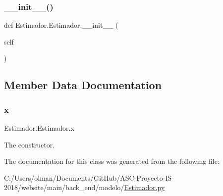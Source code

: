 \subsubsection{\texorpdfstring{\+\_\+\+\_\+init\+\_\+\+\_\+()}{\_\_init\_\_()}}
{\footnotesize\ttfamily def Estimador.\+Estimador.\+\_\+\+\_\+init\+\_\+\+\_\+ (\begin{DoxyParamCaption}\item[{}]{self }\end{DoxyParamCaption})}



\subsection{Member Data Documentation}
\mbox{\label{class_estimador_1_1_estimador_a998588ba815fd0c90fb8abbcf9456693}} 
\subsubsection{\texorpdfstring{x}{x}}
{\footnotesize\ttfamily Estimador.\+Estimador.\+x}



The constructor. 



The documentation for this class was generated from the following file\+:\begin{DoxyCompactItemize}
\item 
C\+:/\+Users/olman/\+Documents/\+Git\+Hub/\+A\+S\+C-\/\+Proyecto-\/\+I\+S-\/2018/website/main/back\+\_\+end/modelo/\mbox{\hyperlink{_estimador_8py}{Estimador.\+py}}\end{DoxyCompactItemize}
